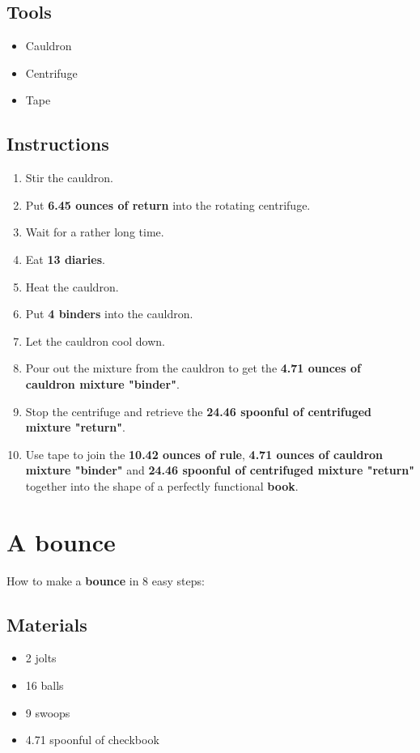 \documentclass{article}
\begin{document}
\subsection{Tools}\begin{itemize}
\item 
Cauldron
\item 
Centrifuge
\item 
Tape
\end{itemize}
\subsection{Instructions}\begin{enumerate}
\item 
Stir the cauldron.
\item 
Put \textbf{6.45 ounces of return} into the rotating centrifuge.
\item 
Wait for a rather long time.
\item 
Eat \textbf{13 diaries}.
\item 
Heat the cauldron.
\item 
Put \textbf{4 binders} into the cauldron.
\item 
Let the cauldron cool down.
\item 
Pour out the mixture from the cauldron to get the \textbf{4.71 ounces of cauldron mixture "binder"}.
\item 
Stop the centrifuge and retrieve the \textbf{24.46 spoonful of centrifuged mixture "return"}.
\item 
Use tape to join the \textbf{10.42 ounces of rule}, \textbf{4.71 ounces of cauldron mixture "binder"} and \textbf{24.46 spoonful of centrifuged mixture "return"} together into the shape of a perfectly functional \textbf{book}.
\end{enumerate}
\newpage
\section{A bounce}How to make a \textbf{bounce} in 8 easy steps:

\subsection{Materials}\begin{itemize}
\item 
2 jolts
\item 
16 balls
\item 
9 swoops
\item 
4.71 spoonful of checkbook
\end{itemize}
\end{document}
